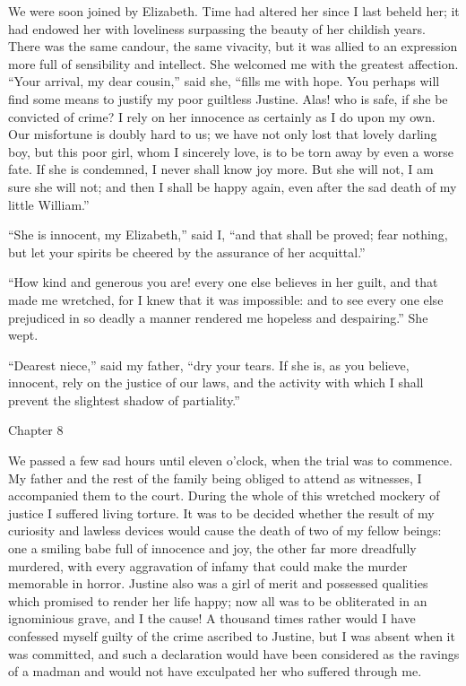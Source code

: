 \documentclass[12pt,openright]{book}
\begin{document}
We were soon joined by Elizabeth. Time had altered her since I last beheld her; it had endowed her with loveliness surpassing the beauty of her childish years. There was the same candour, the same vivacity, but it was allied to an expression more full of sensibility and intellect. She welcomed me with the greatest affection. “Your arrival, my dear cousin,” said she, “fills me with hope. You perhaps will find some means to justify my poor guiltless Justine. Alas! who is safe, if she be convicted of crime? I rely on her innocence as certainly as I do upon my own. Our misfortune is doubly hard to us; we have not only lost that lovely darling boy, but this poor girl, whom I sincerely love, is to be torn away by even a worse fate. If she is condemned, I never shall know joy more. But she will not, I am sure she will not; and then I shall be happy again, even after the sad death of my little William.”

“She is innocent, my Elizabeth,” said I, “and that shall be proved; fear nothing, but let your spirits be cheered by the assurance of her acquittal.”

“How kind and generous you are! every one else believes in her guilt, and that made me wretched, for I knew that it was impossible: and to see every one else prejudiced in so deadly a manner rendered me hopeless and despairing.” She wept.

“Dearest niece,” said my father, “dry your tears. If she is, as you believe, innocent, rely on the justice of our laws, and the activity with which I shall prevent the slightest shadow of partiality.”

Chapter 8

We passed a few sad hours until eleven o’clock, when the trial was to commence. My father and the rest of the family being obliged to attend as witnesses, I accompanied them to the court. During the whole of this wretched mockery of justice I suffered living torture. It was to be decided whether the result of my curiosity and lawless devices would cause the death of two of my fellow beings: one a smiling babe full of innocence and joy, the other far more dreadfully murdered, with every aggravation of infamy that could make the murder memorable in horror. Justine also was a girl of merit and possessed qualities which promised to render her life happy; now all was to be obliterated in an ignominious grave, and I the cause! A thousand times rather would I have confessed myself guilty of the crime ascribed to Justine, but I was absent when it was committed, and such a declaration would have been considered as the ravings of a madman and would not have exculpated her who suffered through me.
\end{document}
